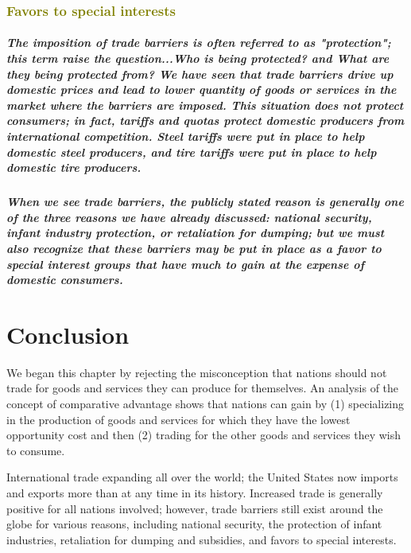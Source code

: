 \documentclass[11pt]{article} %
\begin{document}
\subsubsection*{\textcolor{olive}{Favors to special interests}}
\subparagraph*{The imposition of trade barriers is often referred to as "protection"; this term raise the question...\textit{Who is being protected?} and \textit{What are they being protected from?} We have seen that trade barriers drive up domestic prices and lead to lower quantity of goods or services in the market where the barriers are imposed. This situation does not protect consumers; in fact, tariffs and quotas protect domestic producers from international competition. Steel tariffs were put in place to help domestic steel producers, and tire tariffs were put in place to help domestic tire producers.}
\subparagraph*{When we see trade barriers, the publicly stated reason is generally one of the three reasons we have already discussed: national security, infant industry protection, or retaliation for dumping; but we must also recognize that these barriers may be put in place as a favor to special interest groups that have much to gain at the expense of domestic consumers.}
\section*{Conclusion}
We began this chapter by rejecting the misconception that nations should not trade for goods and services they can produce for themselves. An analysis of the concept of comparative advantage shows that nations can gain by (1) specializing in the production of goods and services for which they have the lowest opportunity cost and then (2) trading for the other goods and services they wish to consume.

International trade expanding all over the world; the United States now imports and exports more than at any time in its history. Increased trade is generally positive for all nations involved; however, trade barriers still exist around the globe for various reasons, including national security, the protection of infant industries, retaliation for dumping and subsidies, and favors to special interests.
\end{document}

